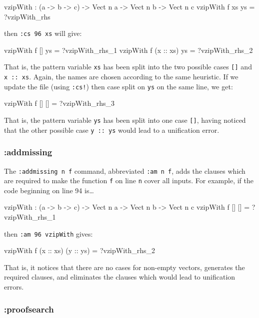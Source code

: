 \begin{code}
vzipWith : (a -> b -> c) -> 
           Vect n a -> Vect n b -> Vect n c
vzipWith f xs ys = ?vzipWith_rhs
\end{code}

\noindent
then \texttt{:cs 96 xs} will give:

\begin{code}
vzipWith f [] ys = ?vzipWith_rhs_1
vzipWith f (x :: xs) ys = ?vzipWith_rhs_2
\end{code}

\noindent
That is, the pattern variable \texttt{xs} has been split into the two possible cases \texttt{[]} and \texttt{x :: xs}. Again, the names are chosen according to the same heuristic.
If we update the file (using \texttt{:cs!}) then case split on \texttt{ys} on the same line, we get:

\begin{code}
vzipWith f [] [] = ?vzipWith_rhs_3
\end{code}

\noindent 
That is, the pattern variable \texttt{ys} has been split into one case \texttt{[]}, \Idris{} having noticed that the other possible case \texttt{y :: ys} would lead to a unification error.

\subsubsection{:addmissing}

The \texttt{:addmissing n f} command, abbreviated \texttt{:am n f}, adds the clauses which are required to make the function \texttt{f} on line \texttt{n} cover all inputs. 
For example, if the code beginning on line 94 is\ldots

\begin{code}
vzipWith : (a -> b -> c) -> 
           Vect n a -> Vect n b -> Vect n c
vzipWith f [] [] = ?vzipWith_rhs_1
\end{code}

\noindent
then \texttt{:am 96 vzipWith} gives:

\begin{code}
vzipWith f (x :: xs) (y :: ys) = ?vzipWith_rhs_2
\end{code}

\noindent
That is, it notices that there are no cases for non-empty vectors, generates the required clauses, and eliminates the clauses which would lead to unification errors.

\subsubsection{:proofsearch}

